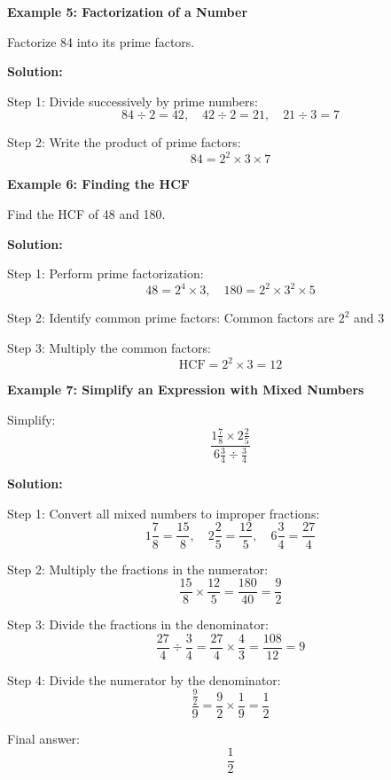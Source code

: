 \begin{flushleft}
\textbf{Example 5: Factorization of a Number}

Factorize 84 into its prime factors.

\textbf{Solution:} \vspace{0.2cm}

Step 1: Divide successively by prime numbers:  
\[
84 \div 2 = 42, \quad 42 \div 2 = 21, \quad 21 \div 3 = 7
\]

Step 2: Write the product of prime factors:  
\[
84 = 2^2 \times 3 \times 7
\]
\end{flushleft}

\begin{flushleft}
\textbf{Example 6: Finding the HCF}

Find the HCF of 48 and 180.

\textbf{Solution:} \vspace{0.2cm}

Step 1: Perform prime factorization:  
\[
48 = 2^4 \times 3, \quad 180 = 2^2 \times 3^2 \times 5
\]

Step 2: Identify common prime factors:  
Common factors are \(2^2\) and \(3\)

Step 3: Multiply the common factors:  
\[
\text{HCF} = 2^2 \times 3 = 12
\]
\end{flushleft}

\begin{flushleft}
\textbf{Example 7: Simplify an Expression with Mixed Numbers}

Simplify:  
\[
\frac{1\frac{7}{8} \times 2\frac{2}{5}}{6\frac{3}{4} \div \frac{3}{4}}
\]

\textbf{Solution:} \vspace{0.2cm}

Step 1: Convert all mixed numbers to improper fractions:
\[
1\frac{7}{8} = \frac{15}{8}, \quad 2\frac{2}{5} = \frac{12}{5}, \quad 6\frac{3}{4} = \frac{27}{4}
\]

Step 2: Multiply the fractions in the numerator:
\[
\frac{15}{8} \times \frac{12}{5} = \frac{180}{40} = \frac{9}{2}
\]

Step 3: Divide the fractions in the denominator:
\[
\frac{27}{4} \div \frac{3}{4} = \frac{27}{4} \times \frac{4}{3} = \frac{108}{12} = 9
\]

Step 4: Divide the numerator by the denominator:
\[
\frac{\frac{9}{2}}{9} = \frac{9}{2} \times \frac{1}{9} = \frac{1}{2}
\]

Final answer:
\[
\boxed{\frac{1}{2}}
\]
\end{flushleft}

